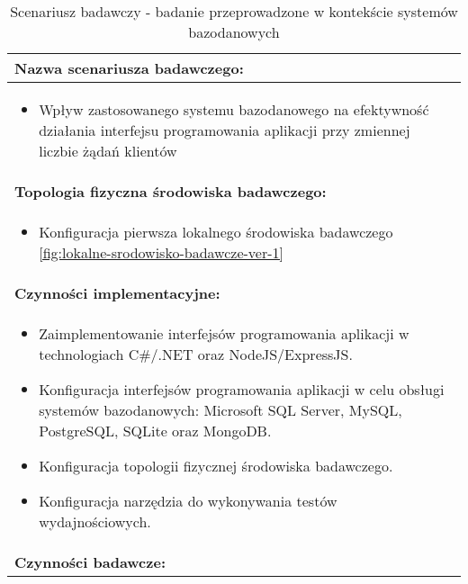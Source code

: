 \setlength{\LTcapwidth}{\textwidth}
\setlength\LTleft{0pt}
\setlength\LTright{0pt}
\begin{longtable}[c]{|llll|}
    \caption{Scenariusz badawczy - badanie przeprowadzone w kontekście systemów bazodanowych}
    \label{tab:research-scenario-1}                                                  \\ \hline
    \multicolumn{4}{|l|}{\textbf{Nazwa scenariusza badawczego:}}                     \\ \hline
    \multicolumn{4}{|p{\linewidth}|}{
        \begin{itemize}[label={}]
            \item Wpływ zastosowanego systemu bazodanowego na efektywność działania interfejsu programowania aplikacji przy zmiennej liczbie żądań klientów
          \end{itemize}
    } \\ \hline
    \multicolumn{4}{|l|}{\textbf{Topologia fizyczna środowiska badawczego:}}         \\ \hline
    \multicolumn{4}{|p{\linewidth}|}{
        \begin{itemize}[label={}]
            \item Konfiguracja pierwsza lokalnego środowiska badawczego \ref{fig:lokalne-srodowisko-badawcze-ver-1}
          \end{itemize}
    }\\ \hline
    \multicolumn{4}{|l|}{\textbf{Czynności implementacyjne:}}                        \\ \hline
    \multicolumn{4}{|p{\linewidth}|}{
        \begin{itemize}
            \item Zaimplementowanie interfejsów programowania aplikacji w technologiach C\#/.NET oraz NodeJS/ExpressJS.
            \item Konfiguracja interfejsów programowania aplikacji w celu obsługi systemów bazodanowych: Microsoft SQL Server, MySQL, PostgreSQL, SQLite oraz MongoDB.
            \item Konfiguracja topologii fizycznej środowiska badawczego.
            \item Konfiguracja narzędzia do wykonywania testów wydajnościowych.
        \end{itemize}}                                                           \\ \hline
    \multicolumn{4}{|l|}{\textbf{Czynności badawcze:}}                               \\ \hline

\end{longtable}
